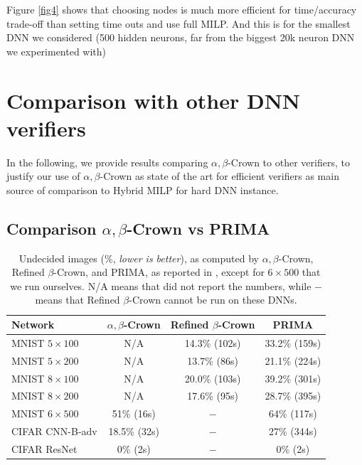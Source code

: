 {Figure \ref{fig4} shows that choosing nodes is much more efficient for time/accuracy trade-off than setting time outs and use full MILP. And this is for the smallest DNN we considered (500 hidden neurons, far from the biggest 20k neuron DNN we experimented with)


\section{Comparison with other DNN verifiers}

In the following, we provide results comparing $\alpha,\beta$-Crown to other verifiers, to justify our use of $\alpha,\beta$-Crown as state of the art for efficient verifiers as main source of comparison to Hybrid MILP for hard DNN instance.


\subsection*{Comparison $\alpha,\beta$-Crown vs PRIMA}


\begin{table}[b!]
	\centering
	\begin{tabular}{||l||c|c||c||}
		\hline \hline
		Network & $\alpha,\beta$-Crown & Refined $\beta$-Crown & PRIMA \\ 		  
		\hline
		MNIST $5 \times 100$ & N/A  & 14.3\% (102s) & 33.2\% (159s)\\ \hline
		MNIST $5 \times 200$ & N/A & 13.7\% (86s) & 21.1\% (224s) \\ \hline
		MNIST $8 \times 100$ & N/A  & 20.0\% (103s) & 39.2\% (301s)   \\ \hline
		MNIST $8 \times 200$ & N/A & 17.6\% (95s) & 28.7\% (395s)  \\ \hline
		MNIST $6 \times 500$ & 51\% (16s) & $-$ & 64\% (117s) \\ \hline
		CIFAR CNN-B-adv & 18.5\% (32s) & $-$ & 27\% (344s)\\ \hline \hline
		CIFAR ResNet & 0\% (2s) & $-$ & 0\% (2s) \\ \hline \hline
	\end{tabular}
	\caption{Undecided images ($\%$, {\em lower is better}), as computed by $\alpha,\beta$-Crown, Refined $\beta$-Crown, and PRIMA, as reported in \cite{crown}, except for $6 \times 500$ that we run ourselves. N/A means that \cite{crown} did not report the numbers, while $-$ means that Refined $\beta$-Crown cannot be run on these DNNs.}
	\label{table9}
	\end{table}


}
